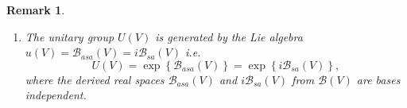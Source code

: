 \documentclass[aps,preprint]{revtex4}%
\newtheorem{remark}[theorem]{Remark}
\begin{document}
\begin{remark}
\begin{enumerate}
\begin{enumerate}
\item
\begin{align}
\left(  \left\vert e_{j}\right\rangle \left\langle e_{k}\right\vert
+\left\vert e_{k}\right\rangle \left\langle e_{j}\right\vert \right)  \left(
\left\vert e_{l}\right\rangle \left\langle e_{m}\right\vert -\left\vert
e_{m}\right\rangle \left\langle e_{l}\right\vert \right)   &  =\left\vert
e_{j}\right\rangle \left\langle e_{k}\right\vert \left\vert e_{l}\right\rangle
\left\langle e_{m}\right\vert +\left\vert e_{k}\right\rangle \left\langle
e_{j}\right\vert \left\vert e_{l}\right\rangle \left\langle e_{m}\right\vert
-\left\vert e_{j}\right\rangle \left\langle e_{k}\right\vert \left\vert
e_{m}\right\rangle \left\langle e_{l}\right\vert -\left\vert e_{k}%
\right\rangle \left\langle e_{j}\right\vert \left\vert e_{m}\right\rangle
\left\langle e_{l}\right\vert \\
&  =\left\vert e_{j}\right\rangle \left\langle e_{m}\right\vert \delta
_{kl}+\left\vert e_{k}\right\rangle \left\langle e_{m}\right\vert \delta
_{jl}-\left\vert e_{j}\right\rangle \left\langle e_{l}\right\vert \delta
_{km}-\left\vert e_{k}\right\rangle \left\langle e_{l}\right\vert \delta
_{jm}\\
\left(  \left\vert e_{l}\right\rangle \left\langle e_{m}\right\vert
-\left\vert e_{m}\right\rangle \left\langle e_{l}\right\vert \right)  \left(
\left\vert e_{j}\right\rangle \left\langle e_{k}\right\vert +\left\vert
e_{k}\right\rangle \left\langle e_{j}\right\vert \right)   &  =\left\vert
e_{l}\right\rangle \left\langle e_{m}\right\vert \left\vert e_{j}\right\rangle
\left\langle e_{k}\right\vert -\left\vert e_{m}\right\rangle \left\langle
e_{l}\right\vert \left\vert e_{j}\right\rangle \left\langle e_{k}\right\vert
+\left\vert e_{l}\right\rangle \left\langle e_{m}\right\vert \left\vert
e_{k}\right\rangle \left\langle e_{j}\right\vert -\left\vert e_{m}%
\right\rangle \left\langle e_{l}\right\vert \left\vert e_{k}\right\rangle
\left\langle e_{j}\right\vert \\
&  =\left\vert e_{l}\right\rangle \left\langle e_{k}\right\vert \delta
_{jm}-\left\vert e_{m}\right\rangle \left\langle e_{k}\right\vert \delta
_{lj}+\left\vert e_{l}\right\rangle \left\langle e_{j}\right\vert \delta
_{km}-\left\vert e_{m}\right\rangle \left\langle e_{j}\right\vert \delta_{lk}.
\end{align}

\end{enumerate}

\item The unitary group $U\left(  V\right)  $ is generated by the Lie algebra
$u\left(  V\right)  =\mathcal{B}_{asa}\left(  V\right)  =i\mathcal{B}%
_{sa}\left(  V\right)  $ i.e.
\begin{equation}
U\left(  V\right)  =\exp\left\{  \mathcal{B}_{asa}\left(  V\right)  \right\}
=\exp\left\{  i\mathcal{B}_{sa}\left(  V\right)  \right\}  ,
\end{equation}
where the derived real spaces $\mathcal{B}_{asa}\left(  V\right)  $ and
$i\mathcal{B}_{sa}\left(  V\right)  $ from $\mathcal{B}\left(  V\right)  $ are
bases independent.


\end{enumerate}
\end{remark}
\end{document}
